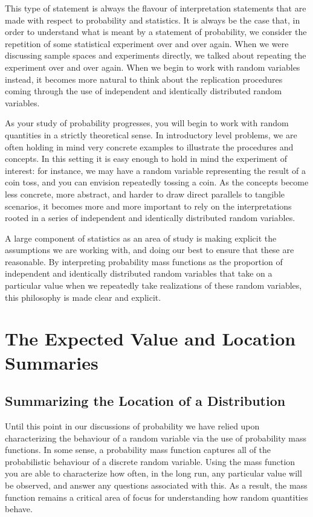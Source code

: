 \documentclass[
  letterpaper,
  DIV=11,
  numbers=noendperiod]{scrreprt}
\theoremstyle{definition}
\theoremstyle{definition}
\theoremstyle{definition}
\theoremstyle{remark}
\begin{document}
This type of statement is always the flavour of interpretation
statements that are made with respect to probability and statistics. It
is always be the case that, in order to understand what is meant by a
statement of probability, we consider the repetition of some statistical
experiment over and over again. When we were discussing sample spaces
and experiments directly, we talked about repeating the experiment over
and over again. When we begin to work with random variables instead, it
becomes more natural to think about the replication procedures coming
through the use of independent and identically distributed random
variables.

As your study of probability progresses, you will begin to work with
random quantities in a strictly theoretical sense. In introductory level
problems, we are often holding in mind very concrete examples to
illustrate the procedures and concepts. In this setting it is easy
enough to hold in mind the experiment of interest: for instance, we may
have a random variable representing the result of a coin toss, and you
can envision repeatedly tossing a coin. As the concepts become less
concrete, more abstract, and harder to draw direct parallels to tangible
scenarios, it becomes more and more important to rely on the
interpretations rooted in a series of independent and identically
distributed random variables.

A large component of statistics as an area of study is making explicit
the assumptions we are working with, and doing our best to ensure that
these are reasonable. By interpreting probability mass functions as the
proportion of independent and identically distributed random variables
that take on a particular value when we repeatedly take realizations of
these random variables, this philosophy is made clear and explicit.

\chapter{The Expected Value and Location
Summaries}\label{the-expected-value-and-location-summaries}

\section{Summarizing the Location of a
Distribution}\label{summarizing-the-location-of-a-distribution}

Until this point in our discussions of probability we have relied upon
characterizing the behaviour of a random variable via the use of
probability mass functions. In some sense, a probability mass function
captures all of the probabilistic behaviour of a discrete random
variable. Using the mass function you are able to characterize how
often, in the long run, any particular value will be observed, and
answer any questions associated with this. As a result, the mass
function remains a critical area of focus for understanding how random
quantities behave.
\end{document}
